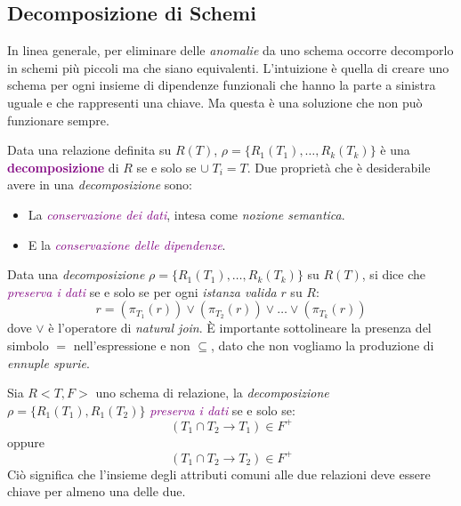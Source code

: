 \subsection{Decomposizione di Schemi}

In linea generale, per eliminare delle \emph{anomalie} da uno schema occorre decomporlo in schemi più piccoli ma che
siano equivalenti. L'intuizione è quella di creare uno schema per ogni insieme di dipendenze funzionali che hanno la parte
a sinistra uguale e che rappresenti una chiave. Ma questa è una soluzione che non può funzionare sempre.

\begin{definition}[Decomposizione]
    Data una relazione definita su $R(T)$, $\rho = \{R_1(T_1), \dots, R_k(T_k)\}$ è una
    \textbf{\textcolor{purple}{decomposizione}} di $R$ se e solo se $\cup \; T_i = T$.
    Due proprietà che è desiderabile avere in una \emph{decomposizione} sono:
    \begin{itemize}
        \item La \emph{\textcolor{purple}{conservazione dei dati}}, intesa come \emph{nozione semantica}.
        \item E la \emph{\textcolor{purple}{conservazione delle dipendenze}}.
    \end{itemize}
\end{definition}

\begin{definition}
    Data una \emph{decomposizione} $\rho = \{R_1(T_1), \dots, R_k(T_k)\}$ su $R(T)$, si dice
    che \emph{\textcolor{purple}{preserva i dati}} se e solo se per ogni \emph{istanza valida} $r$ su $R$:
    \begin{equation*}
        r = (\pi_{T_1}(r)) \vee (\pi_{T_2}(r)) \vee \dots \vee (\pi_{T_k}(r))
    \end{equation*}
    dove $\vee$ è l'operatore di \emph{natural join}. È importante sottolineare la presenza
    del simbolo $=$ nell'espressione e non $\subseteq$, dato che non vogliamo la produzione di \emph{ennuple spurie}.
\end{definition}

\begin{theorem}
    Sia $R<T, F>$ uno schema di relazione, la \emph{decomposizione}
    $\rho = \{R_1(T_1), R_1(T_2)\}$ \emph{\textcolor{purple}{preserva i dati}}
    se e solo se:
    \begin{equation*}
        (T_1 \cap T_2 \rightarrow T_1) \in F^+
    \end{equation*}
    oppure
    \begin{equation*}
        (T_1 \cap T_2 \rightarrow T_2) \in F^+
    \end{equation*}
    Ciò significa che l'insieme degli attributi comuni alle due relazioni deve essere chiave
    per almeno una delle due.
\end{theorem}

